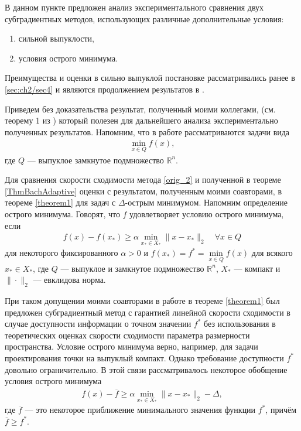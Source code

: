     В данном пункте предложен анализ экспериментального сравнения двух субградиентных методов, использующих различные дополнительные условия:
    \begin{enumerate}
        \item сильной выпуклости,
        \item условия острого минимума.
    \end{enumerate}
    Преимущества и оценки в сильно выпуклой постановке рассматривались ранее в \ref{sec:ch2/sec4} и являются продолжением результатов в \cite{Bach_2012}.

    Приведем без доказательства результат, полученный моими коллегами, (см. теорему 1 из \cite{sharp22}) который полезен для дальнейшего анализа экспериментально полученных результатов. Напомним, что в работе рассматриваются задачи вида
    \begin{gather}\label{min_q}
        \min_{x\in Q} f(x),
    \end{gather}
    где $Q$ --- выпуклое замкнутое подмножество $\mathbb{R}^{n}$. 
    
    Для сравнения скорости сходимости метода \eqref{orig_2} и полученной в теореме \ref{ThmBachAdaptive} оценки с результатом, полученным моими соавторами, в теореме \ref{theorem1} для задач с $\Delta$-острым минимумом. Напомним определение острого минимума. Говорят, что $f$ удовлетворяет условию острого минимума, если
    \begin{gather}\label{sm}
        f(x) - f(x_*) \geq \alpha \min_{x_* \in X_*} \|x- x_*\|_2 \quad \forall x \in Q
    \end{gather}
    для некоторого фиксированного $\alpha >0$ и $f(x_*) = f^* = \min\limits_{x\in Q} f(x)$ для всякого $x_* \in X_*$, где $Q$ --- выпуклое и замкнутое подмножество $\mathbb{R}^n$, $X_*$ --- компакт и $\|\cdot\|_2$ --- евклидова норма. 
    
    При таком допущении моими соавторами в работе \cite{sharp22} в теореме \ref{theorem1} был предложен субградиентный метод с гарантией  линейной скорости сходимости в случае доступности информации о точном значении $f^*$ \cite{Polyak1969} без использования в теоретических оценках скорости сходимости  параметра размерности пространства. Условие острого минимума верно, например, для задачи проектирования точки на выпуклый компакт. Однако требование доступности $f^*$ довольно ограничительно. В этой связи рассматривалось некоторое обобщение условия острого минимума
    \begin{gather}\label{eq_gen_sharp}
        f(x) - \overline{f} \geq \alpha \min_{x_* \in X_*} \|x - x_* \|_2 - \Delta,
    \end{gather}
    где $\overline{f}$  --- это некоторое приближение минимального значения функции $f^*$, причём $\overline{f} \geq f^*$. 

